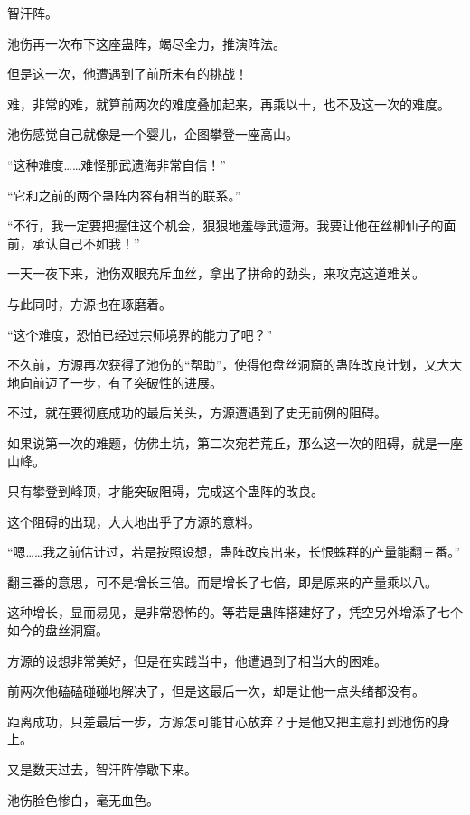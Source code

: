 
\begin{this_body}

智汗阵。

池伤再一次布下这座蛊阵，竭尽全力，推演阵法。

但是这一次，他遭遇到了前所未有的挑战！

难，非常的难，就算前两次的难度叠加起来，再乘以十，也不及这一次的难度。

池伤感觉自己就像是一个婴儿，企图攀登一座高山。

“这种难度……难怪那武遗海非常自信！”

“它和之前的两个蛊阵内容有相当的联系。”

“不行，我一定要把握住这个机会，狠狠地羞辱武遗海。我要让他在丝柳仙子的面前，承认自己不如我！”

一天一夜下来，池伤双眼充斥血丝，拿出了拼命的劲头，来攻克这道难关。

与此同时，方源也在琢磨着。

“这个难度，恐怕已经过宗师境界的能力了吧？”

不久前，方源再次获得了池伤的“帮助”，使得他盘丝洞窟的蛊阵改良计划，又大大地向前迈了一步，有了突破性的进展。

不过，就在要彻底成功的最后关头，方源遭遇到了史无前例的阻碍。

如果说第一次的难题，仿佛土坑，第二次宛若荒丘，那么这一次的阻碍，就是一座山峰。

只有攀登到峰顶，才能突破阻碍，完成这个蛊阵的改良。

这个阻碍的出现，大大地出乎了方源的意料。

“嗯……我之前估计过，若是按照设想，蛊阵改良出来，长恨蛛群的产量能翻三番。”

翻三番的意思，可不是增长三倍。而是增长了七倍，即是原来的产量乘以八。

这种增长，显而易见，是非常恐怖的。等若是蛊阵搭建好了，凭空另外增添了七个如今的盘丝洞窟。

方源的设想非常美好，但是在实践当中，他遭遇到了相当大的困难。

前两次他磕磕碰碰地解决了，但是这最后一次，却是让他一点头绪都没有。

距离成功，只差最后一步，方源怎可能甘心放弃？于是他又把主意打到池伤的身上。

又是数天过去，智汗阵停歇下来。

池伤脸色惨白，毫无血色。


\end{this_body}
